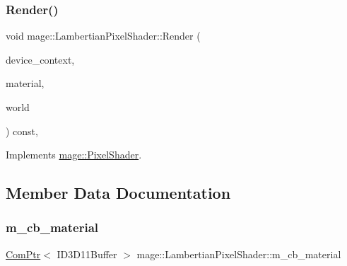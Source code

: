 \hypertarget{classmage_1_1_lambertian_pixel_shader_a9fc8db84f2cd8f6e5722e7436e72e407}{}\label{classmage_1_1_lambertian_pixel_shader_a9fc8db84f2cd8f6e5722e7436e72e407} 
\subsubsection{\texorpdfstring{Render()}{Render()}}
{\footnotesize\ttfamily void mage\+::\+Lambertian\+Pixel\+Shader\+::\+Render (\begin{DoxyParamCaption}\item[{\hyperlink{namespacemage_ae74f374780900893caa5555d1031fd79}{Com\+Ptr}$<$ I\+D3\+D11\+Device\+Context2 $>$}]{device\+\_\+context,  }\item[{const \hyperlink{structmage_1_1_material}{Material} \&}]{material,  }\item[{const \hyperlink{classmage_1_1_world}{World} \&}]{world }\end{DoxyParamCaption}) const\hspace{0.3cm}{\ttfamily [override]}, {\ttfamily [virtual]}}



Implements \hyperlink{classmage_1_1_pixel_shader_a2e47b753e60dc05cf2cc9d4acb87c343}{mage\+::\+Pixel\+Shader}.



\subsection{Member Data Documentation}
\hypertarget{classmage_1_1_lambertian_pixel_shader_aff89982b5f85531515ec2316930b2944}{}\label{classmage_1_1_lambertian_pixel_shader_aff89982b5f85531515ec2316930b2944} 
\subsubsection{\texorpdfstring{m\+\_\+cb\+\_\+material}{m\_cb\_material}}
{\footnotesize\ttfamily \hyperlink{namespacemage_ae74f374780900893caa5555d1031fd79}{Com\+Ptr}$<$ I\+D3\+D11\+Buffer $>$ mage\+::\+Lambertian\+Pixel\+Shader\+::m\+\_\+cb\+\_\+material\hspace{0.3cm}{\ttfamily [private]}}

